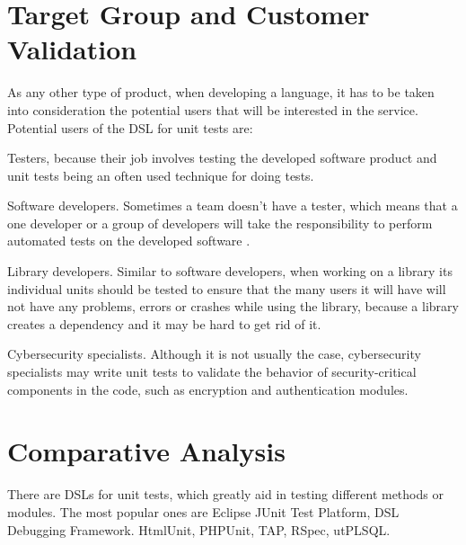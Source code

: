 \section{Target Group and Customer Validation}

As any other type of product, when developing a language, it has to be taken into consideration the potential users that will be interested in the service. Potential users of the DSL for unit tests are:

Testers, because their job involves testing the developed software product and unit tests being an often used technique for doing tests.

Software developers. Sometimes a team doesn’t have a tester, which means that a one developer or a group of developers will take the responsibility to perform automated tests on the developed software \cite{methodpoet}.

Library developers. Similar to software developers, when working on a library its individual units should be tested to ensure that the many users it will have will not have any problems, errors or crashes while using the library, because a library creates a dependency and it may be hard to get rid of it.

Cybersecurity specialists. Although it is not usually the case, cybersecurity specialists may write unit tests to validate the behavior of security-critical components in the code, such as encryption and authentication modules. 

\section{Comparative Analysis}

There are DSLs for unit tests, which greatly aid in testing different methods or modules. The most popular ones are Eclipse JUnit Test Platform, DSL Debugging Framework. HtmlUnit, PHPUnit, TAP, RSpec, utPLSQL.

